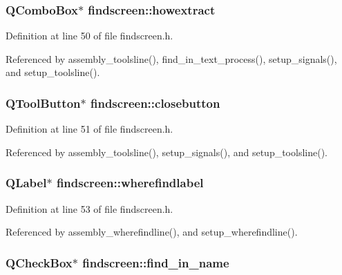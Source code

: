 \subsubsection{\setlength{\rightskip}{0pt plus 5cm}QCombo\-Box$\ast$ {\bf findscreen::howextract}\hspace{0.3cm}{\tt  [private]}}\label{classfindscreen_93a56ea65a506789dc79973c2a0c7b4f}




Definition at line 50 of file findscreen.h.

Referenced by assembly\_\-toolsline(), find\_\-in\_\-text\_\-process(), setup\_\-signals(), and setup\_\-toolsline().
\subsubsection{\setlength{\rightskip}{0pt plus 5cm}QTool\-Button$\ast$ {\bf findscreen::closebutton}\hspace{0.3cm}{\tt  [private]}}\label{classfindscreen_f09efcdef871da758f4781430a5387d0}




Definition at line 51 of file findscreen.h.

Referenced by assembly\_\-toolsline(), setup\_\-signals(), and setup\_\-toolsline().
\subsubsection{\setlength{\rightskip}{0pt plus 5cm}QLabel$\ast$ {\bf findscreen::wherefindlabel}\hspace{0.3cm}{\tt  [private]}}\label{classfindscreen_f9d6d76dc6bbdc944680b4cb9a17fd60}




Definition at line 53 of file findscreen.h.

Referenced by assembly\_\-wherefindline(), and setup\_\-wherefindline().
\subsubsection{\setlength{\rightskip}{0pt plus 5cm}QCheck\-Box$\ast$ {\bf findscreen::find\_\-in\_\-name}\hspace{0.3cm}{\tt  [private]}}\label{classfindscreen_78c21b2cd74345259c68d8e8590a4643}




